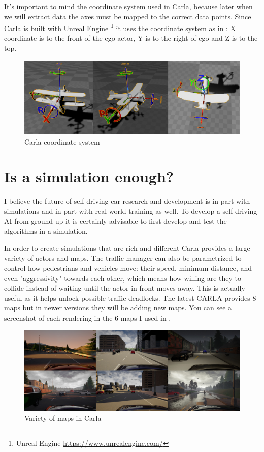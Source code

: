 It's important to mind the coordinate system used in Carla, because later when
we will extract data the axes must be mapped to the correct data points. Since
Carla is built with Unreal Engine \footnote{Unreal Engine
\url{https://www.unrealengine.com/}} it uses the coordinate system as in
: X coordinate is to the front of the ego actor, Y is to the
right of ego and Z is to the top.

\begin{figure}[!ht]
  \centering
  \includegraphics[width=150mm, keepaspectratio]{figures/carlacoords.jpg}
  \caption{Carla coordinate system}
  \label{fig:carlacoords}
\end{figure}


\section{Is a simulation enough?}
I believe the future of self-driving car research and development is in part
with simulations and in part with real-world training as well. To develop a
self-driving AI from ground up it is certainly advisable to first develop and
test the algorithms in a simulation. 

In order to create simulations that are rich and different Carla provides a
large variety of actors and maps. The traffic manager can also be parametrized
to control how pedestrians and vehicles move: their speed, minimum distance, and
even "aggressivity" towards each other, which means how willing are
they to collide instead of waiting until the actor in front moves away. This is
actually useful as it helps unlock possible traffic deadlocks. The latest
CARLA provides 8 maps but in newer versions they will be adding new maps. You
can see a screenshot of each rendering in the 6 maps I used in
.

\begin{figure}[!ht]
  \centering
  \includegraphics[width=150mm, keepaspectratio]{figures/maps.jpg}
  \caption{Variety of maps in Carla}
  \label{fig:maps}
\end{figure}

